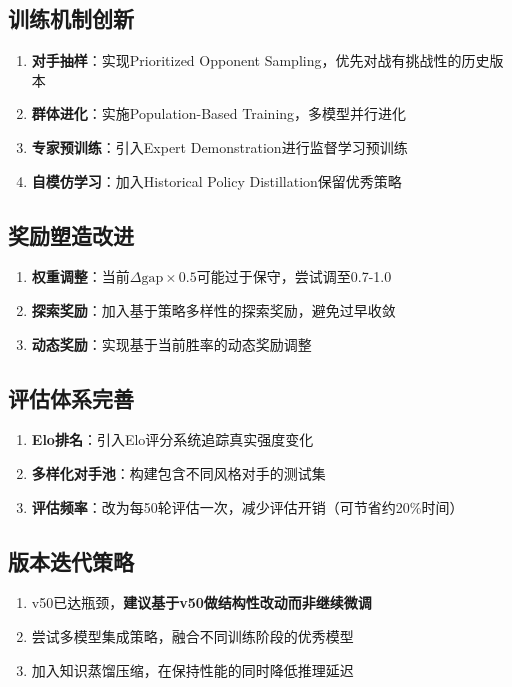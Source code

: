 \documentclass[12pt,a4paper]{article}
\begin{document}
\subsection{训练机制创新}
\begin{enumerate}
\item \textbf{对手抽样}：实现Prioritized Opponent Sampling，优先对战有挑战性的历史版本
\item \textbf{群体进化}：实施Population-Based Training，多模型并行进化
\item \textbf{专家预训练}：引入Expert Demonstration进行监督学习预训练
\item \textbf{自模仿学习}：加入Historical Policy Distillation保留优秀策略
\end{enumerate}

\subsection{奖励塑造改进}
\begin{enumerate}
\item \textbf{权重调整}：当前$\Delta\text{gap} \times 0.5$可能过于保守，尝试调至0.7-1.0
\item \textbf{探索奖励}：加入基于策略多样性的探索奖励，避免过早收敛
\item \textbf{动态奖励}：实现基于当前胜率的动态奖励调整
\end{enumerate}

\subsection{评估体系完善}
\begin{enumerate}
\item \textbf{Elo排名}：引入Elo评分系统追踪真实强度变化
\item \textbf{多样化对手池}：构建包含不同风格对手的测试集
\item \textbf{评估频率}：改为每50轮评估一次，减少评估开销（可节省约20\%时间）
\end{enumerate}

\subsection{版本迭代策略}
\begin{enumerate}
\item v50已达瓶颈，\textbf{建议基于v50做结构性改动而非继续微调}
\item 尝试多模型集成策略，融合不同训练阶段的优秀模型
\item 加入知识蒸馏压缩，在保持性能的同时降低推理延迟
\end{enumerate}
\end{document}
